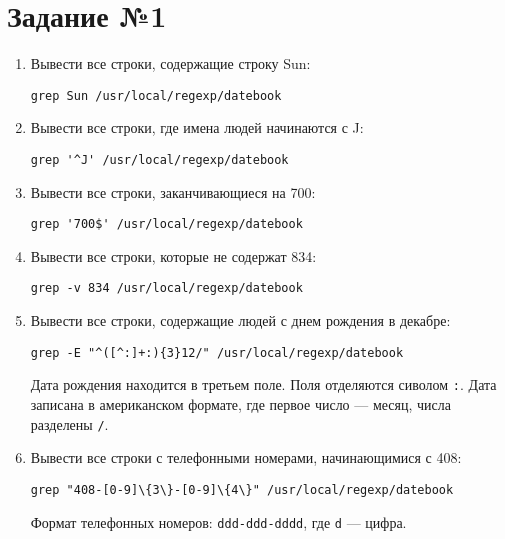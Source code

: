 \documentclass[listings]{labreport}
\begin{document}
\maketitlepage

\section*{Задание №1}

\begin{enumerate}
\item Вывести все строки, содержащие строку Sun:
\begin{verbatim}
grep Sun /usr/local/regexp/datebook
\end{verbatim}

\item Вывести все строки, где имена людей начинаются с J:
\begin{verbatim}
grep '^J' /usr/local/regexp/datebook
\end{verbatim}

\item Вывести все строки, заканчивающиеся на 700:
\begin{verbatim}
grep '700$' /usr/local/regexp/datebook
\end{verbatim}

\item Вывести все строки, которые не содержат 834:
\begin{verbatim}
grep -v 834 /usr/local/regexp/datebook
\end{verbatim}

\item Вывести все строки, содержащие людей с днем рождения в декабре:
\begin{verbatim}
grep -E "^([^:]+:){3}12/" /usr/local/regexp/datebook
\end{verbatim}

\begin{small}
  Дата рождения находится в третьем поле. Поля отделяются сиволом \texttt{:}.
  Дата записана в американском формате, где первое число — месяц, числа разделены \texttt{/}.
  \vspace{2mm}
\end{small}

\item Вывести все строки с телефонными номерами, начинающимися с 408:
\begin{verbatim}
grep "408-[0-9]\{3\}-[0-9]\{4\}" /usr/local/regexp/datebook
\end{verbatim}

\begin{small}
  Формат телефонных номеров: \texttt{ddd-ddd-dddd}, где \texttt{d} — цифра.
  \vspace{2mm}
\end{small}


\end{enumerate}
\end{document}
